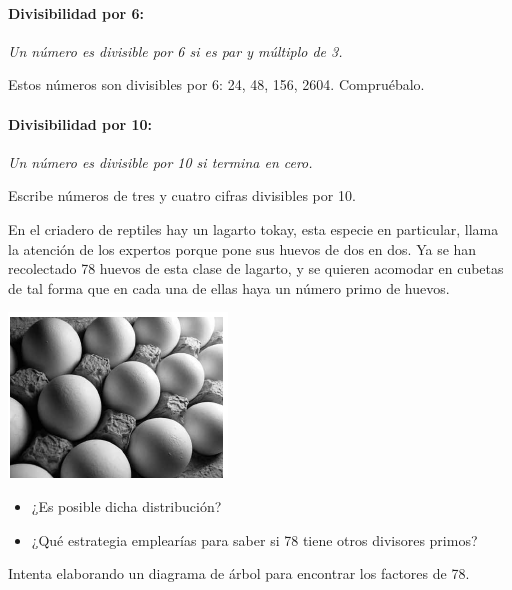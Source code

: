 \documentclass[10pt,twoside]{article}
\begin{document}
\paragraph*{Divisibilidad por 6:} \emph{Un número es divisible por 6 si es par y múltiplo de 3.}

Estos números son divisibles por 6: 24, 48, 156, 2604. Compruébalo.
\paragraph*{Divisibilidad por 10:} \emph{Un número es divisible por 10 si termina en cero.}

Escribe números de tres y cuatro cifras divisibles por 10.

\begin{minipage}{.55\textwidth}
 En el criadero de reptiles hay un lagarto tokay, esta especie
en particular, llama la atención de los expertos porque pone
sus huevos de dos en dos. Ya se han recolectado 78 huevos
de esta clase de lagarto, y se quieren acomodar en cubetas
de tal forma que en cada una de ellas haya un número primo
de huevos.
\end{minipage}
\begin{minipage}{.4\textwidth}
 \begin{center}
 \includegraphics[scale=.85]{./Images/huevos_02.png}
\end{center}
\end{minipage}
\begin{itemize}
 \item  ¿Es posible dicha distribución?
 \item ¿Qué estrategia emplearías para saber si 78 tiene otros divisores primos?
\end{itemize}
Intenta elaborando un diagrama de árbol para encontrar los factores de 78.
\end{document}
